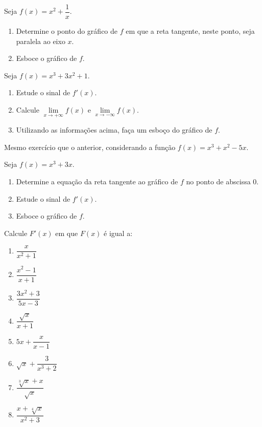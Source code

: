 \begin{exercicio}[3]
Seja $f(x) = x^2 + \dfrac{1}{x}$.
\begin{enumerate}[label=\alph*)]
    \item Determine o ponto do gráfico de $f$ em que a reta tangente, neste ponto, seja paralela ao eixo $x$.
    \item Esboce o gráfico de $f$.
\end{enumerate}
\end{exercicio}

\begin{exercicio}[4]
Seja $f(x) = x^3 + 3x^2 + 1$.
\begin{enumerate}[label=\alph*)]
    \item Estude o sinal de $f'(x)$.
    \item Calcule $\lim\limits_{x \to +\infty} f(x)$ e $\lim\limits_{x \to -\infty} f(x)$.
    \item Utilizando as informações acima, faça um esboço do gráfico de $f$.
\end{enumerate}
\end{exercicio}

\begin{exercicio}[5]
Mesmo exercício que o anterior, considerando a função $f(x) = x^3 + x^2 - 5x$.
\end{exercicio}

\begin{exercicio}[6]
Seja $f(x) = x^3 + 3x$.
\begin{enumerate}[label=\alph*)]
    \item Determine a equação da reta tangente ao gráfico de $f$ no ponto de abscissa 0.
    \item Estude o sinal de $f'(x)$.
    \item Esboce o gráfico de $f$.
\end{enumerate}
\end{exercicio}

\begin{exercicio}[7]
Calcule $F'(x)$ em que $F(x)$ é igual a:
\begin{enumerate}[label=\alph*)]
    \item $\dfrac{x}{x^2 + 1}$
    \item $\dfrac{x^2 - 1}{x + 1}$
    \item $\dfrac{3x^2 + 3}{5x - 3}$
    \item $\dfrac{\sqrt{x}}{x + 1}$
    \item $5x + \dfrac{x}{x - 1}$
    \item $\sqrt{x} + \dfrac{3}{x^3 + 2}$
    \item $\dfrac{\sqrt[3]{x} + x}{\sqrt{x}}$
    \item $\dfrac{x + \sqrt[4]{x}}{x^2 + 3}$
\end{enumerate}
\end{exercicio}

